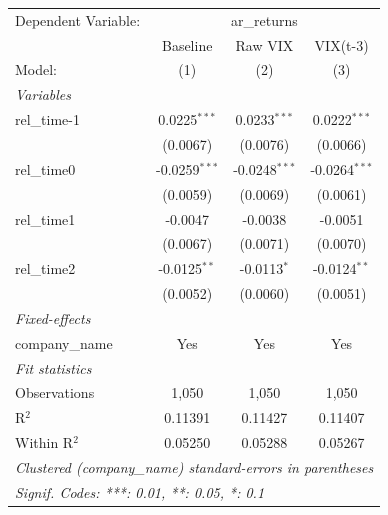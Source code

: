
\begingroup
\centering
\begin{tabular}{lccc}
   \tabularnewline \midrule \midrule
   Dependent Variable: & \multicolumn{3}{c}{ar\_returns}\\
                  & Baseline        & Raw VIX         & VIX(t-3) \\   
   Model:         & (1)             & (2)             & (3)\\  
   \midrule
   \emph{Variables}\\
   rel\_time-1    & 0.0225$^{***}$  & 0.0233$^{***}$  & 0.0222$^{***}$\\   
                  & (0.0067)        & (0.0076)        & (0.0066)\\   
   rel\_time0     & -0.0259$^{***}$ & -0.0248$^{***}$ & -0.0264$^{***}$\\   
                  & (0.0059)        & (0.0069)        & (0.0061)\\   
   rel\_time1     & -0.0047         & -0.0038         & -0.0051\\   
                  & (0.0067)        & (0.0071)        & (0.0070)\\   
   rel\_time2     & -0.0125$^{**}$  & -0.0113$^{*}$   & -0.0124$^{**}$\\   
                  & (0.0052)        & (0.0060)        & (0.0051)\\   
   \midrule
   \emph{Fixed-effects}\\
   company\_name  & Yes             & Yes             & Yes\\  
   \midrule
   \emph{Fit statistics}\\
   Observations   & 1,050           & 1,050           & 1,050\\  
   R$^2$          & 0.11391         & 0.11427         & 0.11407\\  
   Within R$^2$   & 0.05250         & 0.05288         & 0.05267\\  
   \midrule \midrule
   \multicolumn{4}{l}{\emph{Clustered (company\_name) standard-errors in parentheses}}\\
   \multicolumn{4}{l}{\emph{Signif. Codes: ***: 0.01, **: 0.05, *: 0.1}}\\
\end{tabular}
\par\endgroup


